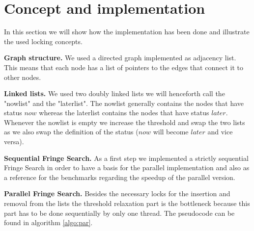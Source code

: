 \documentclass[letterpaper]{article}
\newcommand{\mypar}[1]{{\bf #1.}}
\begin{document}
\section{Concept and implementation}\label{sec:impl}

In this section we will show how the implementation has been done and illustrate  the used locking concepts.

\mypar{Graph structure}
We used a directed graph implemented as adjacency list. This means that each node has a list of pointers to the edges that connect it to other nodes.

\mypar{Linked lists}
We used two doubly linked lists we will henceforth call the "nowlist" and the "laterlist". The nowlist generally contains the nodes that have status $now$ whereas the laterlist contains the nodes that have status $later$. Whenever the nowlist is empty we increase the threshold and swap the two lists as we also swap the definition of the status ($now$ will become $later$ and vice versa).

\mypar{Sequential Fringe Search}
As a first step we implemented a strictly sequential Fringe Search in order to have a basis for the parallel implementation and also as a reference for the benchmarks regarding the speedup of the parallel version.

\mypar{Parallel Fringe Search}
Besides the necessary locks for the insertion and removal from the lists the threshold relaxation part is the bottleneck because this part has to be done sequentially by only one thread. The pseudocode can be found in algorithm \ref{algo:par}.
\end{document}
